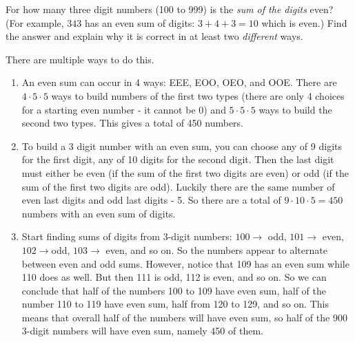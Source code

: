 \begin{questions}



\question[4] For how many three digit numbers (100 to 999) is the {\em sum of the digits} even? (For example, $343$ has an even sum of digits: $3+4+3 = 10$ which is even.)  Find the answer and explain why it is correct in at least two {\em different} ways.

\begin{solution}
  There are multiple ways to do this.
  \begin{enumerate}
    \item An even sum can occur in 4 ways: EEE, EOO, OEO, and OOE.  There are $4 \cdot 5 \cdot 5$ ways to build numbers of the first two types (there are only 4 choices for a starting even number - it cannot be 0) and $5 \cdot 5 \cdot 5$ ways to build the second two types.  This gives a total of 450 numbers.
    \item To build a 3 digit number with an even sum, you can choose any of 9 digits for the first digit, any of 10 digits for the second digit.  Then the last digit must either be even (if the sum of the first two digits are even) or odd (if the sum of the first two digits are odd).  Luckily there are the same number of even last digits and odd last digits - 5.  So there are a total of $9 \cdot 10 \cdot 5 = 450$ numbers with an even sum of digits.
    \item Start finding sums of digits from 3-digit numbers: $100 \to$ odd, $101 \to$ even, $102 \to $odd, $103 \to $ even, and so on.  So the numbers appear to alternate between even and odd sums.  However, notice that 109 has an even sum while 110 does as well.  But then 111 is odd, 112 is even, and so on.  So we can conclude that half of the numbers 100 to 109 have even sum, half of the number 110 to 119 have even sum, half from 120 to 129, and so on.  This means that overall half of the numbers will have even sum, so half of the 900 3-digit numbers will have even sum, namely 450 of them.
  \end{enumerate}
\end{solution}



\end{questions}
